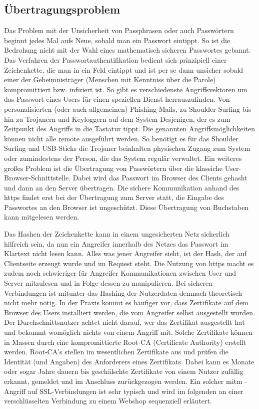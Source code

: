 \subsection{Übertragungsproblem}
Das Problem mit der Unsicherheit von Passphrasen oder auch Passwörtern beginnt jedes Mal aufs Neue, sobald man ein Passwort eintippt. So ist die Bedrohung nicht mit der Wahl eines mathematisch sicheren Passwortes gebannt. Das Verfahren der Passwortauthentifikation bedient sich prinzipiell einer Zeichenkette, die man in ein Feld eintippt und ist per se dann unsicher sobald einer der Geheimnisträger (Menschen mit Kenntniss über die Parole) kompromittiert bzw. infiziert ist. So gibt es verschiedenste Angriffsvektoren um das Passwort eines Users für einen speziellen Dienst herrauszufinden. Von personalisierten (oder auch allgemeinen) Phishing Mails, zu Shoulder Surfing bis hin zu Trojanern und Keyloggern auf dem System Desjenigen, der es zum Zeitpunkt des Angriffs in die Tastatur tippt. Die genannten Angriffsmöglichkeiten können nicht alle remote ausgeführt werden. So benötigt es für das Shoulder Surfing und USB-Sticks die Trojaner beinhalten physischen Zugang zum System oder zumindestens der Person, die das System regulär verwaltet. Ein weiteres großes Problem ist die Übertragung von Passwörtern über die klassiche User-Browser-Schnittstelle. Dabei wird das Passwort im Browser des Clients gehasht und dann an den Server übertragen. Die sichere Kommunikation anhand des \ac{https} findet erst bei der Übertragung zum Server statt, die Eingabe des Passwortes an den Browser ist ungeschützt. Diese Übertragung von Buchstaben kann mitgelesen werden.

Das Hashen der Zeichenkette kann in einem ungesicherten Netz sicherlich hilfreich sein, da nun ein Angreifer innerhalb des Netzes das Passwort im Klartext nicht lesen kann. Alles was jener Angreifer sieht, ist der Hash, der auf Clientseite erzeugt wurde und im Request steht. Die Nutzung von \ac{https} macht es zudem noch schwieriger für Angreifer Kommunikationen zwischen User und Server mitzulesen und in Folge dessen zu manipulieren. Bei sicheren Verbindungen ist mitunter das Hashing der Nutzerdaten demnach theoretisch nicht mehr nötig. In der Praxis kommt es häufiger vor, dass Zertifikate auf dem Browser des Users installiert werden, die vom Angreifer selbst ausgestellt wurden. Der Durchschnittsnutzer achtet nicht darauf, wer das Zertifikat ausgestellt hat und bekommt womöglich nichts von einem Angriff mit. Solche Zertifikate können in Massen durch eine kompromittierte Root-CA (Certificate Authority) erstellt werden. Root-CA's stellen im wesentlichen Zertifikate aus und prüfen die Identität (und Angaben) des Anforderers eines Zertifikats. Dabei kann es Monate oder sogar Jahre dauern bis geschälschte Zertifikate von einem Nutzer zufällig erkannt, gemeldet und im Anschluss zurückgezogen werden. Ein solcher \ac{mitm} - Angriff auf SSL-Verbindungen ist sehr typisch und wird im folgenden an einer verschlüsselten Verbindung zu einem Webshop sequenziell erläutert.

